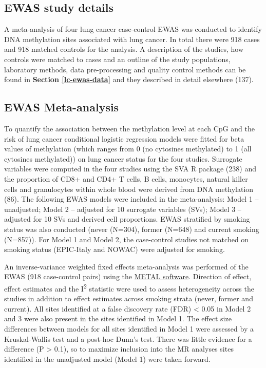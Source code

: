 \documentclass[11pt,twoside]{bristolthesis}
\begin{document}
\hypertarget{ewas-study-details}{%
\subsection{EWAS study details}\label{ewas-study-details}}

A meta-analysis of four lung cancer case-control EWAS was conducted to identify DNA methylation sites associated with lung cancer. In total there were 918 cases and 918 matched controls for the analysis. A description of the studies, how controls were matched to cases and an outline of the study populations, laboratory methods, data pre-processing and quality control methods can be found in \textbf{Section \ref{lc-ewas-data}} and they described in detail elsewhere (137).

\hypertarget{methods-ewas-meta-analysis}{%
\subsection{EWAS Meta-analysis}\label{methods-ewas-meta-analysis}}

To quantify the association between the methylation level at each CpG and the risk of lung cancer conditional logistic regression models were fitted for beta values of methylation (which ranges from 0 (no cytosines methylated) to 1 (all cytosines methylated)) on lung cancer status for the four studies. Surrogate variables were computed in the four studies using the SVA R package (238) and the proportion of CD8+ and CD4+ T cells, B cells, monocytes, natural killer cells and granulocytes within whole blood were derived from DNA methylation (86). The following EWAS models were included in the meta-analysis: Model 1 -- unadjusted; Model 2 -- adjusted for 10 surrogate variables (SVs); Model 3 -- adjusted for 10 SVs and derived cell proportions. EWAS stratified by smoking status was also conducted (never (N=304), former (N=648) and current smoking (N=857)). For Model 1 and Model 2, the case-control studies not matched on smoking status (EPIC-Italy and NOWAC) were adjusted for smoking.

An inverse-variance weighted fixed effects meta-analysis was performed of the EWAS (918 case-control pairs) using the \href{http://csg.sph.umich.edu/abecasis/metal/}{METAL software}. Direction of effect, effect estimates and the I\textsuperscript{2} statistic were used to assess heterogeneity across the studies in addition to effect estimates across smoking strata (never, former and current). All sites identified at a false discovery rate (FDR) \textless{} 0.05 in Model 2 and 3 were also present in the sites identified in Model 1. The effect size differences between models for all sites identified in Model 1 were assessed by a Kruskal-Wallis test and a post-hoc Dunn's test. There was little evidence for a difference (P \textgreater{} 0.1), so to maximize inclusion into the MR analyses sites identified in the unadjusted model (Model 1) were taken forward.
\end{document}
